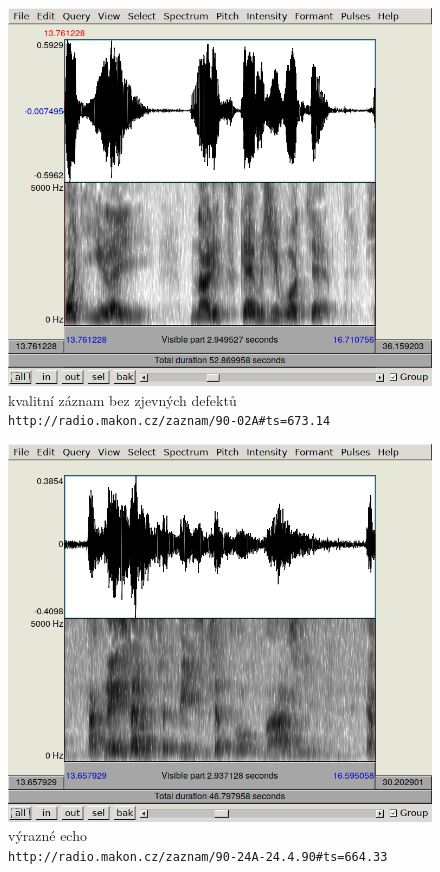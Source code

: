 \begin{figure}[htpb]
\includegraphics[scale=0.89]{rc/spectrum-dobry-90-02A.png}
\caption{
    kvalitní záznam bez zjevných defektů\\
    \texttt{http://radio.makon.cz/zaznam/90-02A\#ts=673.14}
}
\label{fig:spectr-ok}
\end{figure}

\begin{figure}[htpb]
\includegraphics[scale=0.89]{rc/spectrum-echo-90-24A.png}
\caption{
    výrazné echo\\
    \texttt{http://radio.makon.cz/zaznam/90-24A-24.4.90\#ts=664.33}
}
\label{fig:spectr-echo}
\end{figure}

